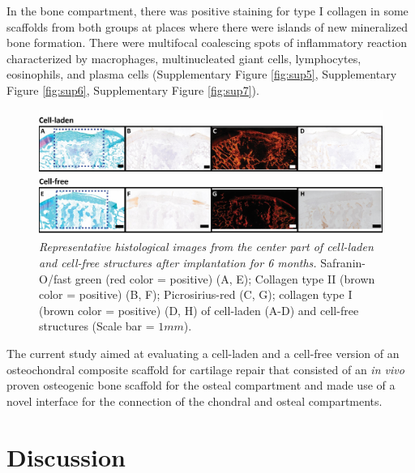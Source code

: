 \documentclass[twocolumn, empirical, authordate, issue]{jote-new-article}
\begin{document}
In the bone compartment, there was positive staining for type I collagen in some scaffolds from both groups at places where there were islands of new mineralized bone formation. There were multifocal coalescing spots of inflammatory reaction characterized by macrophages, multinucleated giant cells, lymphocytes, eosinophils, and plasma cells (Supplementary Figure \ref{fig:sup5}, Supplementary Figure \ref{fig:sup6}, Supplementary Figure \ref{fig:sup7}).

\begin{figure}[b]
\centering \includegraphics[width=\textwidth]{media/image11.jpg}
\caption{\emph{Representative histological images from the center part of cell-laden and cell-free structures after implantation for 6 months.} Safranin-O/fast green (red color = positive) (A, E); Collagen type II (brown color = positive) (B, F); Picrosirius-red (C, G); collagen type I (brown color = positive) (D, H) of cell-laden (A-D) and cell-free structures (Scale bar = $1mm$).}
\label{fig:figure11}\end{figure}

\begin{originalPurpose}
The current study aimed at evaluating a cell-laden and a cell-free version of an osteochondral composite scaffold for cartilage repair that consisted of an \emph{in vivo} proven osteogenic bone scaffold for the osteal compartment and made use of a novel interface for the connection of the chondral and osteal compartments.
\end{originalPurpose}
\section{Discussion} 
\end{document}
